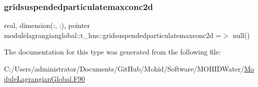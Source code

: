 \mbox{\label{structmodulelagrangianglobal_1_1t__hns_a40ca312cb61b0bd9cbbe94332c14ba1e}} 
\subsubsection{\texorpdfstring{gridsuspendedparticulatemaxconc2d}{gridsuspendedparticulatemaxconc2d}}
{\footnotesize\ttfamily real, dimension(\+:, \+:), pointer modulelagrangianglobal\+::t\+\_\+hns\+::gridsuspendedparticulatemaxconc2d =$>$ null()\hspace{0.3cm}{\ttfamily [private]}}



The documentation for this type was generated from the following file\+:\begin{DoxyCompactItemize}
\item 
C\+:/\+Users/administrator/\+Documents/\+Git\+Hub/\+Mohid/\+Software/\+M\+O\+H\+I\+D\+Water/\mbox{\hyperlink{_module_lagrangian_global_8_f90}{Module\+Lagrangian\+Global.\+F90}}\end{DoxyCompactItemize}
